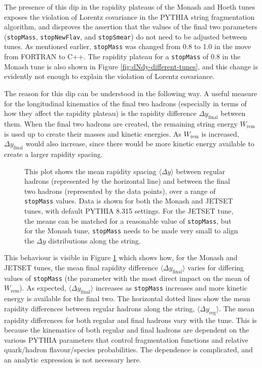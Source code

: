 \documentclass[12pt,a4paper]{report}
\begin{document}
The presence of this dip in the rapidity plateaus of the Monash and Hoeth tunes exposes the violation of Lorentz covariance in the PYTHIA string fragmentation algorithm, and disproves the assertion that the values of the final two parameters (\texttt{stopMass}, \texttt{stopNewFlav}, and \texttt{stopSmear}) do not need to be adjusted between tunes. As mentioned earlier, \texttt{stopMass} was changed from 0.8 to 1.0 in the move from FORTRAN to C++. The rapidity plateau for a \texttt{stopMass} of 0.8 in the Monash tune is also shown in Figure \ref{fig:dNdy-different-tunes}, and this change is evidently not enough to explain the violation of Lorentz covariance.

The reason for this dip can be understood in the following way. A useful measure for the longitudinal kinematics of the final two hadrons (especially in terms of how they affect the rapidity plateau) is the rapidity difference $\Delta y_\text{final}$ between them. When the final two hadrons are created, the remaining string energy $W_\text{rem}$ is used up to create their masses and kinetic energies. As $W_\text{rem}$ is increased, $\Delta y_\text{final}$ would also increase, since there would be more kinetic energy available to create a larger rapidity spacing.

\begin{figure}
  \centering
  
  \caption{This plot shows the mean rapidity spacing $\langle \Delta y \rangle$ between regular hadrons (represented by the horizontal line) and between the final two hadrons (represented by the data points), over a range of \texttt{stopMass} values. Data is shown for both the Monash and JETSET tunes, with default PYTHIA 8.315 settings. For the JETSET tune, the means can be matched for a reasonable value of \texttt{stopMass}, but for the Monash tune, \texttt{stopMass} needs to be made very small to align the $\Delta y$ distributions along the string.}
  \label{fig:deltay-stopmass}
\end{figure}

This behaviour is visible in Figure \ref{fig:deltay-stopmass} which shows how, for the Monash and JETSET tunes, the mean final rapidity difference $\langle\Delta y_\text{final}\rangle$ varies for differing values of \texttt{stopMass} (the parameter with the most direct impact on the mean of $W_\text{rem}$). As expected, $\langle\Delta y_\text{final}\rangle$ increases as \texttt{stopMass} increases and more kinetic energy is available for the final two. The horizontal dotted lines show the mean rapidity differences between regular hadrons along the string, $\langle\Delta y_\text{reg}\rangle$. The mean rapidity differences for both regular and final hadrons vary with the tune. This is because the kinematics of both regular and final hadrons are dependent on the various PYTHIA parameters that control fragmentation functions and relative quark/hadron flavour/species probabilities. The dependence is complicated, and an analytic expression is not necessary here.
\end{document}

